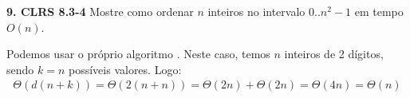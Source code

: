 
\noindent \textbf{9. CLRS 8.3-4} Mostre como ordenar $n$ inteiros no intervalo $0..n^2-1$ em tempo $O(n)$.

Podemos usar o próprio algoritmo . Neste caso, temos $n$ inteiros de 2 dígitos, sendo $k = n$ possíveis valores. Logo:
\begin{align*}
\Theta(d(n + k)) = \Theta(2(n + n)) = \Theta(2n) + \Theta(2n) = \Theta(4n) = \Theta(n)
\end{align*}
